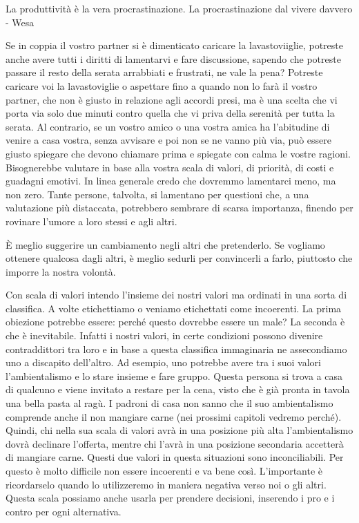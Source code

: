 \documentclass[12pt]{book} %
\begin{document}
La produttività è la vera procrastinazione. La procrastinazione dal vivere davvero - Wesa 

Se in coppia il vostro partner si è dimenticato caricare la lavastoviiglie, potreste anche avere tutti i diritti di lamentarvi e fare discussione, sapendo che potreste passare il resto della
serata arrabbiati e frustrati, ne vale la pena? Potreste caricare voi la lavastoviglie o aspettare fino a quando non
lo farà il vostro partner, che non è giusto in relazione agli accordi presi, ma è una scelta che vi porta via solo due
minuti contro quella che vi priva della serenità per tutta la serata. Al contrario, se un vostro amico o una vostra
amica ha l'abitudine di venire a casa vostra, senza avvisare e poi non se ne vanno più via, può
essere giusto spiegare che devono chiamare prima e spiegate con calma le vostre ragioni. Bisognerebbe valutare in base
alla vostra scala di valori, di priorità, di costi e guadagni emotivi. In linea generale credo che dovremmo lamentarci
meno, ma non zero. Tante persone, talvolta, si lamentano per questioni che, a una valutazione più distaccata, potrebbero sembrare di scarsa importanza, finendo per rovinare l'umore a loro stessi e agli altri.

È meglio suggerire un cambiamento negli altri che pretenderlo. Se vogliamo ottenere qualcosa dagli altri, è meglio
sedurli per convincerli a farlo, piuttosto che imporre la nostra volontà.

Con scala di valori intendo l'insieme dei nostri valori ma ordinati in una sorta di
classifica. A volte etichettiamo o veniamo etichettati come incoerenti. La prima obiezione potrebbe essere: perché
questo dovrebbe essere un male? La seconda è che è inevitabile. Infatti i nostri valori, in certe condizioni possono
divenire contraddittori tra loro e in base a questa classifica immaginaria ne assecondiamo uno a discapito
dell'altro. Ad esempio, uno potrebbe avere tra i suoi valori l'ambientalismo
e lo stare insieme e fare gruppo. Questa persona si trova a casa di qualcuno e viene invitato a restare per la cena,
visto che è già pronta in tavola una bella pasta al ragù. I padroni di casa non sanno che il suo ambientalismo
comprende anche il non mangiare carne (nei prossimi capitoli vedremo perché). Quindi, chi nella sua scala di valori
avrà in una posizione più alta l'ambientalismo dovrà declinare l'offerta,
mentre chi l'avrà in una posizione secondaria accetterà di mangiare carne. Questi due valori in
questa situazioni sono inconciliabili. Per questo è molto difficile non essere incoerenti e va bene così.
L'importante è ricordarselo quando lo utilizzeremo in maniera negativa verso noi o gli altri.
Questa scala possiamo anche usarla per prendere decisioni, inserendo i pro e i contro per ogni alternativa.
\end{document}
